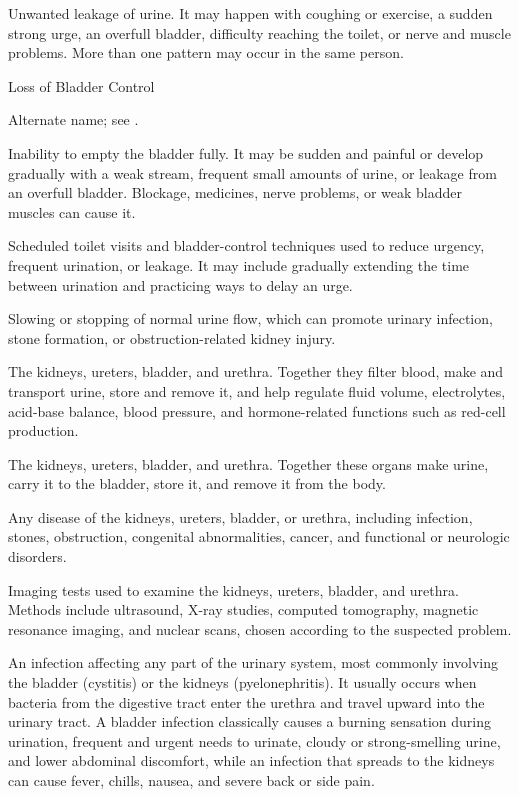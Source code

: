  Unwanted leakage of urine. It may happen with coughing or exercise, a sudden strong urge, an overfull bladder, difficulty reaching the toilet, or nerve and muscle problems. More than one pattern may occur in the same person.


\synonyms
Loss of Bladder Control

 Alternate name; see .

 Inability to empty the bladder fully. It may be sudden and painful or develop gradually with a weak stream, frequent small amounts of urine, or leakage from an overfull bladder. Blockage, medicines, nerve problems, or weak bladder muscles can cause it.

 Scheduled toilet visits and bladder-control techniques used to reduce urgency, frequent urination, or leakage. It may include gradually extending the time between urination and practicing ways to delay an urge.

 Slowing or stopping of normal urine flow, which can promote urinary infection, stone formation, or obstruction-related kidney injury.

 The kidneys, ureters, bladder, and urethra. Together they filter blood, make and transport urine, store and remove it, and help regulate fluid volume, electrolytes, acid-base balance, blood pressure, and hormone-related functions such as red-cell production.

 The kidneys, ureters, bladder, and urethra. Together these organs make urine, carry it to the bladder, store it, and remove it from the body.

 Any disease of the kidneys, ureters, bladder, or urethra, including infection, stones, obstruction, congenital abnormalities, cancer, and functional or neurologic disorders.

 Imaging tests used to examine the kidneys, ureters, bladder, and urethra. Methods include ultrasound, X-ray studies, computed tomography, magnetic resonance imaging, and nuclear scans, chosen according to the suspected problem.

 An infection affecting any part of the urinary system, most commonly involving the bladder (cystitis) or the kidneys (pyelonephritis). It usually occurs when bacteria from the digestive tract enter the urethra and travel upward into the urinary tract. A bladder infection classically causes a burning sensation during urination, frequent and urgent needs to urinate, cloudy or strong-smelling urine, and lower abdominal discomfort, while an infection that spreads to the kidneys can cause fever, chills, nausea, and severe back or side pain.

